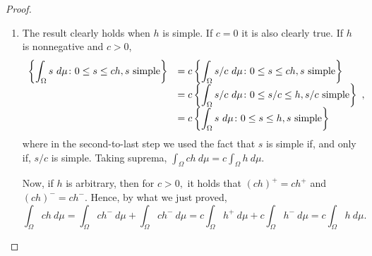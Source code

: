 \begin{proof}
	\begin{enumerate}
		\item The result clearly holds when \(h\) is simple. If \(c=0\) it is
also clearly true. If \(h\) is nonnegative and \(c>0\),
		\[
		\begin{array}{>{\displaystyle}r>{\displaystyle}l} \left\{\int_{\Omega}s~d\mu\colon 0\leq s\leq ch, s \text{
simple}\right\}&=c\left\{\int_{\Omega}s/c~d\mu\colon 0\leq s\leq ch, s \text{
simple}\right\}\\ &=c\left\{\int_{\Omega}s/c~d\mu\colon 0\leq s/c\leq h, s/c \text{
simple}\right\}\\ &=c\left\{\int_{\Omega}s~d\mu\colon 0\leq s\leq h, s \text{
simple}\right\}
		\end{array},
		\] where in the second-to-last step we used the fact that \(s\) is
simple if, and only if, \(s/c\) is simple. Taking suprema,
\(\int_{\Omega}ch~d\mu=c\int_{\Omega}h~d\mu.\)
		
		Now, if \(h\) is arbitrary, then for \(c>0,\) it holds that
\((ch)^+=ch^+\) and \((ch)^-=ch^-\). Hence, by what we just proved,
		\[\int_{\Omega}ch~d\mu=\int_{\Omega}ch^-~d\mu+\int_{\Omega}ch^-~d\mu=c\int_{\Omega}h^+~d\mu+c\int_{\Omega}h^-~d\mu=c\int_{\Omega}h~d\mu.\]
		

\end{enumerate}
\end{proof}
